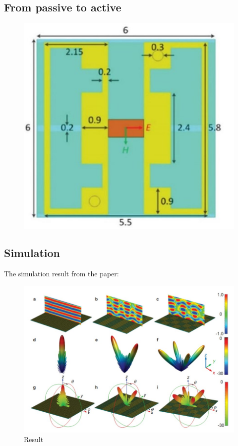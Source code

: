 \documentclass[]{article}
\begin{document}
	\subsection*{From passive to active}
	\begin{figure}[H]
		\centering
		\includegraphics[scale=0.8]{Fig/3.jpg}
	\end{figure}
	
	\subsection*{Simulation}
	\par The simulation result from the paper:
	\begin{figure}[H]
		\centering
		\includegraphics[scale=1]{Fig/4.jpg}
		\caption{Result}
	\end{figure}
\end{document}
